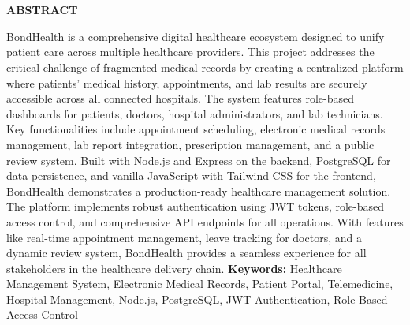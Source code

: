 \chapter*{}
\thispagestyle{footeronly}
\begin{center}
{\Large \textbf{ABSTRACT}}
\end{center}
\noindent
BondHealth is a comprehensive digital healthcare ecosystem designed to unify patient care across multiple healthcare providers. This project addresses the critical challenge of fragmented medical records by creating a centralized platform where patients' medical history, appointments, and lab results are securely accessible across all connected hospitals.
\noindent
The system features role-based dashboards for patients, doctors, hospital administrators, and lab technicians. Key functionalities include appointment scheduling, electronic medical records management, lab report integration, prescription management, and a public review system. Built with Node.js and Express on the backend, PostgreSQL for data persistence, and vanilla JavaScript with Tailwind CSS for the frontend, BondHealth demonstrates a production-ready healthcare management solution.
\noindent
The platform implements robust authentication using JWT tokens, role-based access control, and comprehensive API endpoints for all operations. With features like real-time appointment management, leave tracking for doctors, and a dynamic review system, BondHealth provides a seamless experience for all stakeholders in the healthcare delivery chain.
\noindent
\textbf{Keywords:} Healthcare Management System, Electronic Medical Records, Patient Portal, Telemedicine, Hospital Management, Node.js, PostgreSQL, JWT Authentication, Role-Based Access Control

